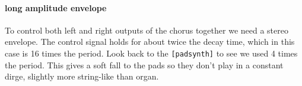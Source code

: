 \paragraph{long amplitude envelope}
To control both left and right outputs of
the chorus together we need a stereo 
envelope. The control signal holds
for about twice the decay time, which
in this case is 16 times the period. Look
back to the \verb+[padsynth]+ to see we
used 4 times the period. This gives a soft
fall to the pads so they don't play
in a constant dirge, slightly more string-like
than organ.